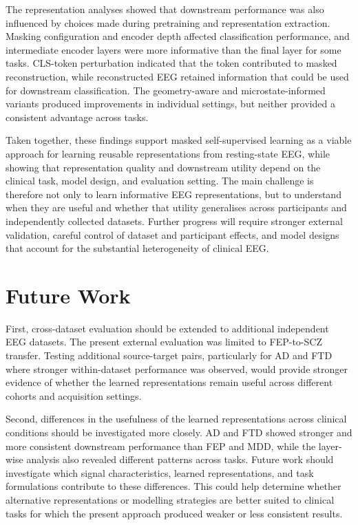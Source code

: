 The representation analyses showed that downstream performance was also influenced by choices made during pretraining and representation extraction. Masking configuration and encoder depth affected classification performance, and intermediate encoder layers were more informative than the final layer for some tasks. CLS-token perturbation indicated that the token contributed to masked reconstruction, while reconstructed EEG retained information that could be used for downstream classification. The geometry-aware and microstate-informed variants produced improvements in individual settings, but neither provided a consistent advantage across tasks.

Taken together, these findings support masked self-supervised learning as a viable approach for learning reusable representations from resting-state EEG, while showing that representation quality and downstream utility depend on the clinical task, model design, and evaluation setting. The main challenge is therefore not only to learn informative EEG representations, but to understand when they are useful and whether that utility generalises across participants and independently collected datasets. Further progress will require stronger external validation, careful control of dataset and participant effects, and model designs that account for the substantial heterogeneity of clinical EEG.


\section{Future Work}

First, cross-dataset evaluation should be extended to additional independent EEG datasets. The present external evaluation was limited to FEP-to-SCZ transfer. Testing additional source-target pairs, particularly for AD and FTD where stronger within-dataset performance was observed, would provide stronger evidence of whether the learned representations remain useful across different cohorts and acquisition settings.

Second, differences in the usefulness of the learned representations across clinical conditions should be investigated more closely. AD and FTD showed stronger and more consistent downstream performance than FEP and MDD, while the layer-wise analysis also revealed different patterns across tasks. Future work should investigate which signal characteristics, learned representations, and task formulations contribute to these differences. This could help determine whether alternative representations or modelling strategies are better suited to clinical tasks for which the present approach produced weaker or less consistent results.

